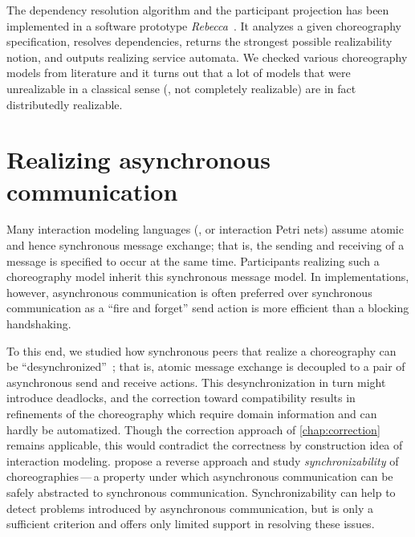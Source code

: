 The dependency resolution algorithm and the participant projection has been implemented in a software prototype \emph{Rebecca}~\cite{rebecca}. It analyzes a given choreography specification, resolves dependencies, returns the strongest possible realizability notion, and outputs realizing service automata. We checked various choreography models from literature and it turns out that a lot of models that were unrealizable in a classical sense (\ie, not completely realizable) are in fact distributedly realizable.





\section{Realizing asynchronous communication}
\label{sect:realizability_asynchron}

Many interaction modeling languages (\eg,  or interaction Petri nets) assume atomic and hence synchronous message exchange; that is, the sending and receiving of a message is specified to occur at the same time. Participants realizing such a choreography model inherit this synchronous message model. In implementations, however, asynchronous communication is often preferred over synchronous communication as a ``fire and forget'' send action is more efficient than a blocking handshaking.

To this end, we studied how synchronous peers that realize a choreography can be ``desynchronized''~\cite{DeckerBKL_2008_icsoc}; that is, atomic message exchange is decoupled to a pair of asynchronous send and receive actions. This desynchronization in turn might introduce deadlocks, and the correction toward compatibility results in refinements of the choreography which require domain information and can hardly be automatized. Though the correction approach of \autoref{chap:correction} remains applicable, this would contradict the correctness by construction idea of interaction modeling. \citet{FuBS_2005_tse} propose a reverse approach and study \emph{synchronizability} of choreographies\,---\,a property under which asynchronous communication can be safely abstracted to synchronous communication. Synchronizability can help to detect problems introduced by asynchronous communication, but is only a sufficient criterion and offers only limited support in resolving these issues.

